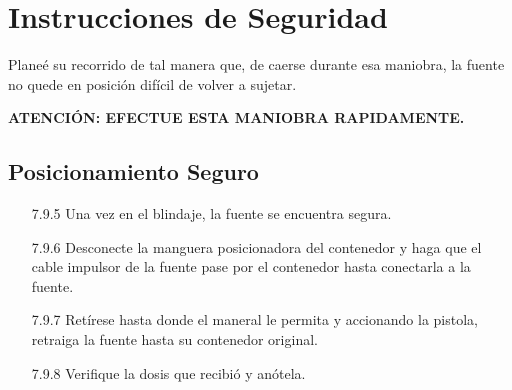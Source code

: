 \section{Instrucciones de Seguridad}

Planeé su recorrido de tal manera que, de caerse durante esa maniobra, la fuente no quede en posición difícil de volver a sujetar.
\begin{center}
    \textbf{ATENCIÓN: EFECTUE ESTA MANIOBRA RAPIDAMENTE.}
\end{center}

\subsection{Posicionamiento Seguro}
    \begin{enumerate}
        \item[7.9.5] Una vez en el blindaje, la fuente se encuentra segura.
        \item[7.9.6] Desconecte la manguera posicionadora del contenedor y haga que el cable impulsor de la fuente pase por el contenedor hasta conectarla a la fuente.
        \item[7.9.7] Retírese hasta donde el maneral le permita y accionando la pistola, retraiga la fuente hasta su contenedor original.
        \item[7.9.8] Verifique la dosis que recibió y anótela.
    \end{enumerate}

